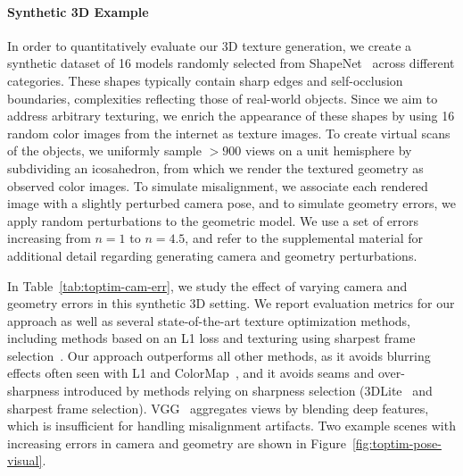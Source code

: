 \paragraph*{Synthetic 3D Example}
In order to quantitatively evaluate our 3D texture generation, we create a synthetic dataset of 16 models randomly selected from ShapeNet~\cite{chang2015shapenet} across different categories. 
These shapes typically contain sharp edges and self-occlusion boundaries, complexities reflecting those of real-world objects.
Since we aim to address arbitrary texturing, we enrich the appearance of these shapes by using 16 random color images from the internet as texture images. 
To create  virtual scans of the objects, we uniformly sample $>900$ views on a unit hemisphere by subdividing an icosahedron, from which we render the textured geometry as observed color images. 
To simulate misalignment, we associate each rendered image with a slightly perturbed camera pose, and to simulate geometry errors, we apply random perturbations to the geometric model.
We use a set of errors increasing from $n=1$ to $n=4.5$, and refer to the supplemental material for additional detail regarding generating camera and geometry perturbations.


In Table~\ref{tab:toptim-cam-err}, we study the effect of varying camera and geometry errors in this synthetic 3D setting.  We report evaluation metrics for our approach as well as several state-of-the-art texture optimization methods, including methods based on an L1 loss and texturing using sharpest frame selection~\cite{vu2011bf}.
Our approach outperforms all other methods, as it avoids blurring effects often seen with L1 and ColorMap~\cite{zhou2014color}, and it avoids seams and over-sharpness introduced by methods relying on sharpness selection (3DLite~\cite{huang20173dlite} and sharpest frame selection).
VGG~\cite{johnson2016perceptual} aggregates views by blending deep features, which is insufficient for handling misalignment artifacts.
Two example scenes with increasing errors in camera and geometry are shown in Figure~\ref{fig:toptim-pose-visual}.

